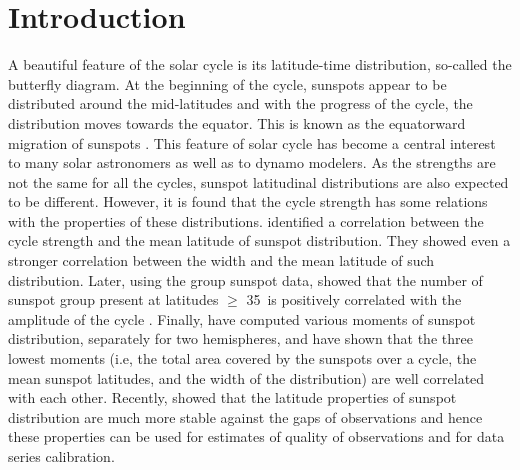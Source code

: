 \documentclass[preprint2,times,tighten]{aastex61}
\begin{document}
\section{Introduction}
A beautiful feature of the solar cycle is its latitude-time distribution,
so-called the butterfly diagram.
At the beginning of the cycle, 
sunspots appear to be distributed around the mid-latitudes and with the progress
of the cycle, the distribution moves towards the equator. 
This is known as the equatorward migration of sunspots \citep{2011SoPh..273..221H}.
This feature of solar cycle has become a central interest to many solar astronomers as well as to dynamo modelers.
As the strengths are not the same for all the cycles, sunspot latitudinal distributions are also expected to be different.
However, it is found that the cycle strength has some relations with the properties of these distributions.
\citet{2000JApA...21..163S} identified a correlation between the cycle strength and the mean latitude of sunspot distribution.
They showed even a stronger correlation between the width and the mean latitude of such distribution.
Later, using the group sunspot data, \citet{2003SoPh..215...99L} showed that
the number of sunspot group present at latitudes $\geq$ 35\textdegree\
is positively correlated with the amplitude of the cycle \citep[also see][]{2017A&A...599A.131L}.
Finally, \citet{2008A&A...483..623S} have computed various moments of sunspot distribution, separately for two hemispheres,
and have shown that the three lowest moments (i.e, the total area covered by the sunspots over a cycle, the mean sunspot latitudes, and the width of the distribution) are well correlated with each other.
Recently, \cite{IM16} showed that the latitude properties of sunspot distribution are much
more stable against the gaps of observations and hence these properties can be used for estimates of
quality of observations and for data series calibration.
\end{document}
